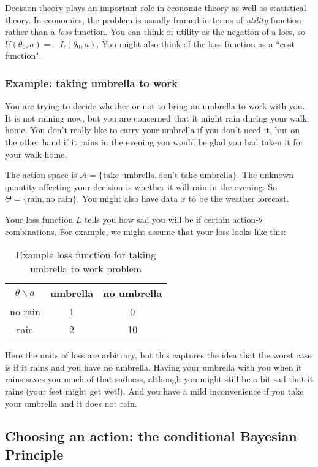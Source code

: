 \documentclass[12pt]{article}
\def\A{\mathcal A}
\begin{document}
Decision theory plays an important role in economic theory as well as statistical theory. In economics,
the problem is usually framed in terms of {\it utility} function rather than a {\it loss} function. You can think of utility as the negation of a loss,
 so $U(\theta_0,a) = -L(\theta_0,a)$. You might also think of the loss function as a ``cost function".
   
\subsubsection{Example: taking umbrella to work}

You are trying to decide whether or not to bring an umbrella to work with you.
It is not raining now, but you are concerned that it might rain during your walk home.
 You don't really like to carry your umbrella if you don't need it, but on the other hand if it rains
 in the evening you would be glad you had taken it for your walk home.
 
 The action space is $\A=\{\text{take umbrella},\text{don't take umbrella}\}$. The
 unknown quantity affecting your decision is whether it will rain in the evening.
 So $\Theta=\{ \text{rain}, \text{no rain}\}$.
 You might also have data $x$ to be the weather forecast.
 
 Your loss function $L$ tells you how sad you will be if certain action-$\theta$ combinations.
 For example, we might assume that your loss looks like this:
 
 \begin{table}[h!]
 \center
 \begin{tabular}{c|cc} 
 $\theta \backslash a$ & umbrella & no umbrella  \\ \hline 
 no rain & 1 & 0 \\
 rain & 2 & 10 \\
 \end{tabular}  \label{tab:L}
 \caption{Example loss function for taking umbrella to work problem} 
 \end{table}
 
Here the units of loss are arbitrary, but this captures the idea that the worst
case is if it rains and you have no umbrella. Having your umbrella with you when it rains
saves you much of that sadness, although you might still be a bit sad that it rains (your feet might get wet!). And
you have a mild inconvenience if you take your umbrella and it does not rain.

 
\subsection{Choosing an action: the conditional Bayesian Principle}
\end{document}
